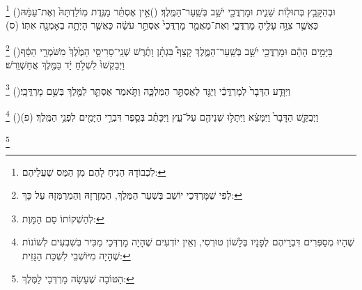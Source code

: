 \documentclass[12pt, openany]{book}
\newcommand{\footnotecomment}[1]{
	\renewcommand\thefootnote{}
	\footnote{\textsf{#1}}}
\newcommand{\commenta}[1]{\footnotecomment{#1}\hspace{0em}}
\newcommand{\vsnum}[1]{(\hebrewnumeral{#1})\space}
\begin{document}
{\commenta{ לִכְבוֹדָהּ הֵנִיחַ לָהֶם מִן הַמַּס שֶׁעֲלֵיהֶם:}%
\vsnum{19}וּבְהִקָּבֵ֥ץ בְּתוּל֖וֹת שֵׁנִ֑ית וּמָרְדֳּכַ֖י יֹשֵׁ֥ב בְּשַֽׁעַר־הַמֶּֽלֶךְ׃
\vsnum{20}אֵ֣ין אֶסְתֵּ֗ר מַגֶּ֤דֶת מֽוֹלַדְתָּהּ֙ וְאֶת־עַמָּ֔הּ כַּאֲשֶׁ֛ר צִוָּ֥ה עָלֶ֖יהָ מָרְדֳּכָ֑י וְאֶת־מַאֲמַ֤ר מָרְדֳּכַי֙ אֶסְתֵּ֣ר עֹשָׂ֔ה כַּאֲשֶׁ֛ר הָיְתָ֥ה בְאָמְנָ֖ה אִתּֽוֹ׃ (ס)%
\commenta{ לְפִי שֶׁמָּרְדְּכַי יוֹשֵׁב בְּשַׁעַר הַמֶּלֶךְ, הַמְזָרְזָהּ וְהַמְרַמְּזָהּ עַל כָּךְ: }%
\vsnum{21}בַּיָּמִ֣ים הָהֵ֔ם וּמָרְדֳּכַ֖י יֹשֵׁ֣ב בְּשַֽׁעַר־הַמֶּ֑לֶךְ קָצַף֩ בִּגְתָ֨ן וָתֶ֜רֶשׁ שְׁנֵֽי־סָרִיסֵ֤י הַמֶּ֙לֶךְ֙ מִשֹּׁמְרֵ֣י הַסַּ֔ף וַיְבַקְשׁוּ֙ לִשְׁלֹ֣חַ יָ֔ד בַּמֶּ֖לֶךְ אֲחַשְׁוֵֽרֹשׁ׃%
\commenta{ לְהַשְׁקוֹתוֹ סַם הַמָּוֶת:}%
\vsnum{22}וַיִּוָּדַ֤ע הַדָּבָר֙ לְמָרְדֳּכַ֔י וַיַּגֵּ֖ד לְאֶסְתֵּ֣ר הַמַּלְכָּ֑ה וַתֹּ֧אמֶר אֶסְתֵּ֛ר לַמֶּ֖לֶךְ בְּשֵׁ֥ם מָרְדֳּכָֽי׃%
\commenta{ שֶׁהָיוּ מְסַפְּרִים דִּבְרֵיהֶם לְפָנָיו בְּלָשׁוֹן טוּרְסִי, וְאֵין יוֹדְעִים שֶׁהָיָה מָרְדְּכַי מַכִּיר בְּשִׁבְעִים לְשׁוֹנוֹת שֶׁהָיָה מִיּוֹשְׁבֵי לִשְׁכַּת הַגָּזִית: }%
\vsnum{23}וַיְבֻקַּ֤שׁ הַדָּבָר֙ וַיִּמָּצֵ֔א וַיִּתָּל֥וּ שְׁנֵיהֶ֖ם עַל־עֵ֑ץ וַיִּכָּתֵ֗ב בְּסֵ֛פֶר דִּבְרֵ֥י הַיָּמִ֖ים לִפְנֵ֥י הַמֶּֽלֶךְ׃ (פ)%
\commenta{ הַטּוֹבָה שֶׁעָשָׂה מָרְדְּכַי לַמֶּלֶךְ:}%
\clearpage}
\end{document}
